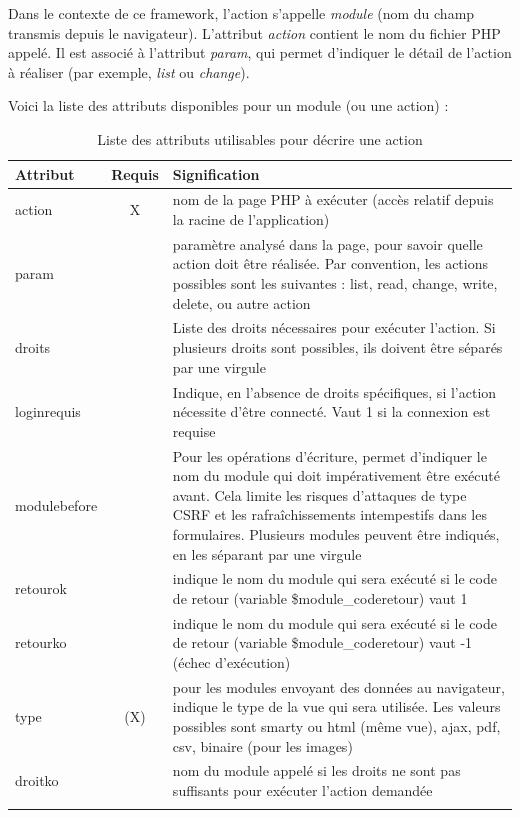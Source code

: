 Dans le contexte de ce framework, l'action s'appelle \textit{module} (nom du champ transmis depuis le navigateur). L'attribut \textit{action} contient le nom du fichier PHP appelé. Il est associé à l'attribut \textit{param}, qui permet d'indiquer le détail de l'action à réaliser (par exemple, \textit{list} ou \textit{change}).

Voici la liste des attributs disponibles pour un module (ou une action) :
\begin{longtable}{|p{2.5cm}|c|p{9cm}|}
\hline
\textbf{Attribut} & \textbf{Requis} & \textbf{Signification} \\
\hline
\endhead
action & X & nom de la page PHP à exécuter (accès relatif depuis la racine de l'application) \\
 \hline
param &  & paramètre analysé dans la page, pour savoir quelle action doit être réalisée. Par convention, les actions possibles sont les suivantes : list, read, change, write, delete, ou autre action \\
 \hline
droits &  & Liste des droits nécessaires pour exécuter l'action. Si plusieurs droits sont possibles, ils doivent être séparés par une virgule\\
 \hline
loginrequis & & Indique, en l'absence de droits spécifiques, si l'action nécessite d'être connecté. Vaut 1 si la connexion est requise\\
 \hline
modulebefore & & Pour les opérations d'écriture, permet d'indiquer le nom du module qui doit impérativement être exécuté avant. Cela limite les risques d'attaques de type CSRF et les rafraîchissements intempestifs dans les formulaires. Plusieurs modules peuvent être indiqués, en les séparant par une virgule\\
 \hline
retourok & & indique le nom du module qui sera exécuté si le code de retour (variable \$module\_coderetour) vaut 1 \\
 \hline
retourko & & indique le nom du module qui sera exécuté si le code de retour (variable \$module\_coderetour) vaut -1 (échec d'exécution) \\
 \hline
type & (X) & pour les modules envoyant des données au navigateur, indique le type de la vue qui sera utilisée. Les valeurs possibles sont smarty ou html (même vue), ajax, pdf, csv, binaire (pour les images)  \\
 \hline
droitko & & nom du module appelé si les droits ne sont pas suffisants pour exécuter l'action demandée \\
\hline 
 
 \caption{Liste des attributs utilisables pour décrire une action}\label{actions}
\end{longtable}

